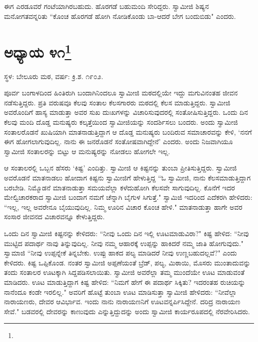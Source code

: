 ಈಗ ಎರಡೂವರೆ ಗಂಟೆಯಾಗಿರಬಹುದು. ಹೊರಗಡೆ ಬಹುಮಂದಿ ಸೇರಿದ್ದರು. ಸ್ವಾಮೀಜಿ ಶಿಷ್ಯನ ಮನೋಗತವನ್ನರಿತು “ಕೊಂಚ ಹೊರಗಡೆ ಹೋಗಿ ನೋಡಿಕೊಂಡು ಬಾ-ಆದರೆ ಬೇಗ ಬಂದುಬಿಡು" ಎಂದರು.

\newpage

\chapter[ಅಧ್ಯಾಯ ೪೧]{ಅಧ್ಯಾಯ ೪೧\protect\footnote{}}

\begin{center}
ಸ್ಥಳ: ಬೇಲೂರು ಮಠ, ವರ್ಷ: ಕ್ರಿ.ಶ. ೧೯೦೨.
\end{center}

ಪೂರ್ವ ಬಂಗಾಳದಿಂದ ಹಿಂತಿರುಗಿ ಬಂದಾಗಿನಿಂದಲೂ ಸ್ವಾಮೀಜಿ ಮಠದಲ್ಲಿಯೇ ಇದ್ದು ಮಗುವಿನಂತಹ ಜೀವನ ನಡೆಸುತ್ತಿದ್ದರು. ಪ್ರತಿ ವರುಷವೂ ಕೆಲವು ಸಂತಾಲ ಕೆಲಸಗಾರರು ಮಠದಲ್ಲಿ ಕೆಲಸ ಮಾಡುತ್ತಿದ್ದರು. ಸ್ವಾಮೀಜಿ ಅವರೊಂದಿಗೆ ಹಾಸ್ಯ ಮಾಡುತ್ತಾ ಅವರ ಸುಖ ದುಃಖಗಳನ್ನು ವಿಚಾರಿಸುವುದರಲ್ಲಿ ಸಂತೋಷಿಸುತ್ತಿದ್ದರು. ಒಂದು ದಿನ ಕೆಲವು ಮಂದಿ ದೊಡ್ಡ ಮನುಷ್ಯರು ಕಲ್ಕತ್ತೆಯಿಂದ ಸ್ವಾಮೀಜಿಯನ್ನು ಸಂದರ್ಶಿಸಲು ಬಂದರು. ಅಂದು ಸ್ವಾಮೀಜಿ ಸಂತಾಲರೊಡನೆ ಖುಷಿಯಾಗಿ ಮಾತನಾಡುತ್ತಿದ್ದಾಗ ಆ ದೊಡ್ಡ ಮನುಷ್ಯರು ಬಂದಿರುವ ಸಮಾಚಾರವನ್ನು ಕೇಳಿ, ‘ನನಗೆ ಈಗ ಹೋಗಲಾಗುವುದಿಲ್ಲ. ನಾನು ಈ ಜನರೊಡನೆ ಸಂತೋಷವಾಗಿದ್ದೇನೆ’ ಎಂದರು. ಅಂದು ನಿಜವಾಗಿಯೂ ಸ್ವಾಮೀಜಿ ಸಂತಾಲರನ್ನು ಬಿಟ್ಟು ಆ ಮನುಷ್ಯರನ್ನು ನೋಡಲು ಹೋಗಲೇ ಇಲ್ಲ.

ಆ ಸಂತಾಲರಲ್ಲಿ ಒಬ್ಬನ ಹೆಸರು ‘ಕಿಷ್ಟ’ ಎಂದಿತ್ತು. ಸ್ವಾಮೀಜಿ ಆ ಕಿಷ್ಟನನ್ನು ತುಂಬಾ ಪ್ರೀತಿಸುತ್ತಿದ್ದರು. ಸ್ವಾಮೀಜಿ ಅವರೊಡನೆ ಮಾತನಾಡಲು ಹೋದಾಗ ಕಿಷ್ಟನು ಸ್ವಾಮೀಜಿಗೆ ಹೇಳುತ್ತಿದ್ದ “ಓ ಸ್ವಾಮೀಜಿ, ನಾನು ಕೆಲಸಮಾಡುತ್ತಿದ್ದಾಗ ಬರಬೇಡಿ. ನಿಮ್ಮೊಡನೆ ಮಾತನಾಡುತ್ತಾ ಸಮಯವೆಲ್ಲಾ ಕಳೆದುಹೋಗಿ ಕೆಲಸವೇ ಸಾಗುವುದಿಲ್ಲ. ಕೊನೆಗೆ ಇದರ ಮೇಲ್ವಿಚಾರಕರಾದ ಸ್ವಾಮೀಜಿ ಬಂದಾಗ ನಮಗೆ ಚೆನ್ನಾಗಿ ಬೈಗುಳ ಸಿಗುತ್ತೆ." ಸ್ವಾಮಿಜಿ ಇದರಿಂದ ಎದೆಕರಗಿ ಹೇಳಿದರು: “ಇಲ್ಲ, ಇಲ್ಲ ಅವರೇನೂ ಬೈಯುವುದಿಲ್ಲ. ನಿಮ್ಮ ಊರಿನ ವಿಚಾರ ಕೊಂಚ ಹೇಳಿ." ಮಾತನಾಡುತ್ತಾ ಹಾಗೇ ಅವರ ಸಂಸಾರ ಜೀವನದ ವಿಚಾರವನ್ನೂ ಕೇಳುತ್ತಿದ್ದರು.

ಒಂದು ದಿನ ಸ್ವಾಮೀಜಿ ಕಿಷ್ಟನನ್ನು ಕೇಳಿದರು: “ನೀವು ಒಂದು ದಿನ ಇಲ್ಲಿ ಊಟಮಾಡುವಿರಾ?" ಕಿಷ್ಟ ಹೇಳಿದ: “ನೀವು ಮುಟ್ಟಿದ ಪದಾರ್ಥ ನಾವು ತಿನ್ನುವುದಿಲ್ಲ. ನೀವು ನಮ್ಮ ಆಹಾರಕ್ಕೆ ಉಪ್ಪನ್ನು ಹಾಕಿದರೆ ನಮ್ಮ ಜಾತಿ ಹೋಗುವುದು." ಸ್ವಾಮಾಜಿ “ನೀವು ಉಪ್ಪನ್ನೇಕೆ ತಿನ್ನಬೇಕು. ಉಪ್ಪು ಹಾಕದ ಪಲ್ಯ ಮಾಡಿದರೆ ನೀವು ಉಣ್ಣಬಹುದಲ್ಲವೆ?" ಎಂದು ಕೇಳಿದರು. ಕಿಷ್ಟ ಒಪ್ಪಿಕೊಂಡ. ನಂತರ ಸ್ವಾಮೀಜಿ ಅಪ್ಪಣೆಯಂತೆ ಬ್ರೆಡ್, ಪಲ್ಯ, ಮಿಠಾಯಿ, ಮೊಸರು ಮುಂತಾದುವನ್ನು ತಂದು ಸಂತಾಲರ ಊಟಕ್ಕಾಗಿ ಸಿದ್ದಪಡಿಸಲಾಯಿತು. ಸ್ವಾಮೀಜಿ ಅವರೆಲ್ಲಾ ತಮ್ಮ ಮುಂದೆಯೇ ಊಟ ಮಾಡುವಂತೆ ಮಾಡಿದರು. ಊಟ ಮಾಡುತ್ತಿದ್ದಾಗ ಕಿಷ್ಟ ಹೇಳಿದ: “ನಿಮಗೆ ಹೇಗೆ ಈ ಪದಾರ್ಥ ಸಿಕ್ಕಿತು? ಇದರಂತಹ ರುಚಿಯನ್ನು ನಾನೆಂದೂ ಕಂಡೇ ಇರಲಿಲ್ಲ." ಅವರಿಗೆ ಹೊಟ್ಟೆ ತುಂಬಾ ಊಟ ಮಾಡಿಸುತ್ತಾ ಸ್ವಾಮೀಜಿ ಹೇಳಿದರು: “ನೀವೆಲ್ಲಾ ನಾರಾಯಣರು, ದೇವರ ಆವಿರ್ಭಾವ. ಇಂದು ನಾನು ನಾರಾಯಣನಿಗೆ ಊಟವನ್ನರ್ಪಿಸಿದ್ದೇನೆ. ದರಿದ್ರ ನಾರಾಯಣ ಸೇವೆ." ಬಡವರಲ್ಲಿ ದೇವರನ್ನು ಕಾಣುವುದು ಎನ್ನುತ್ತಿದ್ದುದನ್ನು ಅಂದು ಸ್ವಾಮೀಜಿ ಕಾರ್ಯರೂಪದಲ್ಲಿ ನೆರವೇರಿಸಿದರು.

